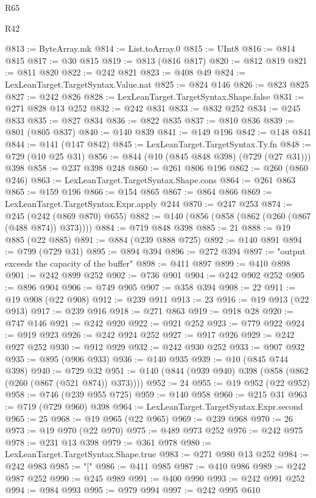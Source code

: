 \begin{lexlean}{R65}
\begin{lexlean}{R42}
\begin{coremodule}
{{{{{{{{{{{{{{{{{{{{{{{{{{{{{{{{{{{{{{{{{{{{{{{{{{{{{{{{{{{{{{{{{{{{{{{{{{{{{{{{{{{{{{{{{{{{{{{{{{{{{{{{{{{{{{{{{{{{{{{{{{{{{{{{{{{{{{{{{{{{{{{{{{{{{{{{{{{{{{{{{{{{{{{{{{{{{{{{{{{{{{{@813 := ByteArray.mk
@814 := List.toArray.{0}
@815 := UInt8
@816 := @814 @815
@817 := @30 @815
@819 := @813 (@816 @817)
@820 := @812 @819
@821 := @811 @820
@822 := @242 @821
@823 := @408 @49
@824 := LexLeanTarget.TargetSyntax.Value.nat
@825 := @824 @146
@826 := @823 @825
@827 := @242 @826
@828 := LexLeanTarget.TargetSyntax.Shape.false
@831 := @271 @828 @13 @252
@832 := @242 @831
@833 := @832 @252
@834 := @245 @833
@835 := @827 @834
@836 := @822 @835
@837 := @810 @836
@839 := @801 (@805 @837)
@840 := @140 @839
@841 := @149 @196
@842 := @148 @841
@844 := @141 (@147 @842)
@845 := LexLeanTarget.TargetSyntax.Ty.fn
@848 := @729 (@10 @25 @31)
@856 := @844 (@10 (@845 @848 @398) (@729 (@27 @31))) @398
@858 := @237 @398 @248
@860 := @261 @806 @196
@862 := @260 (@860 @246)
@863 := LexLeanTarget.TargetSyntax.Shape.cons
@864 := @261 @863
@865 := @159 @196
@866 := @154 @865
@867 := @864 @866
@869 := LexLeanTarget.TargetSyntax.Expr.apply @244
@870 := @247 @253
@874 := @245 (@242 (@869 @870) @655)
@882 := @140 (@856 (@858 (@862 (@260 (@867 (@488 @874)) @373))))
@884 := @719 @848 @398
@885 := 21
@888 := @19 @885 (@22 @885)
@891 := @884 (@239 @888 @725)
@892 := @140 @891
@894 := @799 (@729 @31)
@895 := @894 @394
@896 := @272 @394
@897 := "output exceeds the capacity of the buffer"
@898 := @411 @897
@899 := @410 @898
@901 := @242 @899 @252
@902 := @736 @901
@904 := @242 @902 @252
@905 := @896 @904
@906 := @749 @905
@907 := @358 @394
@908 := 22
@911 := @19 @908 (@22 @908)
@912 := @239 @911
@913 := 23
@916 := @19 @913 (@22 @913)
@917 := @239 @916
@918 := @271 @863
@919 := @918 @28
@920 := @747 @146
@921 := @242 @920
@922 := @921 @252
@923 := @779 @922
@924 := @919 @923
@926 := @242 @924 @252
@927 := @917 @926
@929 := @242 @927 @252
@930 := @912 @929
@932 := @242 @930 @252
@933 := @907 @932
@935 := @895 (@906 @933)
@936 := @140 @935
@939 := @10 (@845 @744 @398)
@940 := @729 @32
@951 := @140 (@844 (@939 @940) @398 (@858 (@862 (@260 (@867 (@521 @874)) @373))))
@952 := 24
@955 := @19 @952 (@22 @952)
@958 := @746 (@239 @955 @725)
@959 := @140 @958
@960 := @215 @31
@963 := @719 (@729 @960) @398
@964 := LexLeanTarget.TargetSyntax.Expr.second
@965 := 25
@968 := @19 @965 (@22 @965)
@969 := @239 @968
@970 := 26
@973 := @19 @970 (@22 @970)
@975 := @489 @973 @252
@976 := @242 @975
@978 := @231 @13 @398
@979 := @361 @978
@980 := LexLeanTarget.TargetSyntax.Shape.true
@983 := @271 @980 @13 @252
@984 := @242 @983
@985 := "["
@986 := @411 @985
@987 := @410 @986
@989 := @242 @987 @252
@990 := @245 @989
@991 := @400 @990
@993 := @242 @991 @252
@994 := @984 @993
@995 := @979 @994
@997 := @242 @995 @610
}}}}}}}}}}}}}}}}}}}}}}}}}}}}}}}}}}}}}}}}}}}}}}}}}}}}}}}}}}}}}}}}}}}}}}}}}}}}}}}}}}}}}}}}}}}}}}}}}}}}}}}}}}}}}}}}}}}}}}}}}}}}}}}}}}}}}}}}}}}}}}}}}}}}}}}}}}}}}}}}}}}}}}}}}}}}}}}}}}}}}}}
\end{coremodule}
\end{lexlean}
\end{lexlean}
